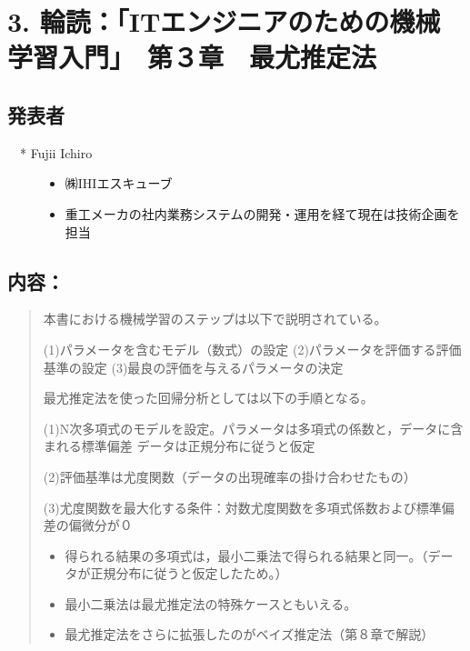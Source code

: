 \documentclass[letterpaper,10pt,dvipdfmx]{sphinxmanual}
\begin{document}
\section{3. 輪読：「ITエンジニアのための機械学習入門」　第３章　最尤推定法}
\label{minute-05-20160824:it-3}

\subsection{発表者}
\label{minute-05-20160824:id6}\begin{description}
\item[{　* Fujii Ichiro}] \leavevmode\begin{itemize}
\item {} 
㈱IHIエスキューブ

\item {} 
重工メーカの社内業務システムの開発・運用を経て現在は技術企画を担当

\end{itemize}

\end{description}


\subsection{内容：}
\label{minute-05-20160824:id7}\begin{quote}

本書における機械学習のステップは以下で説明されている。

(1)パラメータを含むモデル（数式）の設定
(2)パラメータを評価する評価基準の設定
(3)最良の評価を与えるパラメータの決定

最尤推定法を使った回帰分析としては以下の手順となる。

(1)N次多項式のモデルを設定。パラメータは多項式の係数と，データに含まれる標準偏差
データは正規分布に従うと仮定

(2)評価基準は尤度関数（データの出現確率の掛け合わせたもの）

(3)尤度関数を最大化する条件：対数尤度関数を多項式係数および標準偏差の偏微分が０
\begin{itemize}
\item {} 
得られる結果の多項式は，最小二乗法で得られる結果と同一。（データが正規分布に従うと仮定したため。）

\item {} 
最小二乗法は最尤推定法の特殊ケースともいえる。

\item {} 
最尤推定法をさらに拡張したのがベイズ推定法（第８章で解説）

\end{itemize}
\end{quote}
\end{document}
